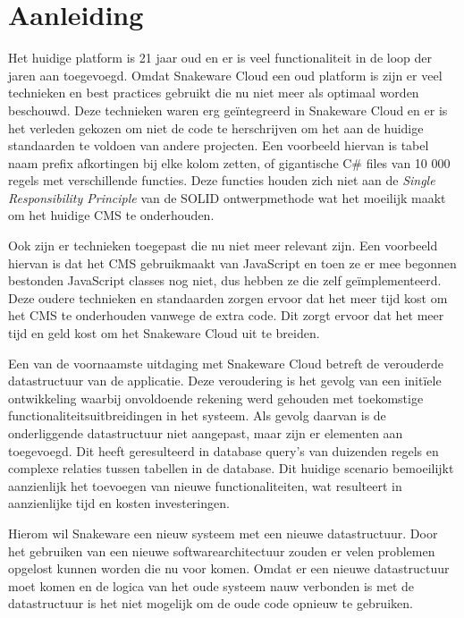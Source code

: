 \section{Aanleiding}
Het huidige platform is 21 jaar oud en er is veel functionaliteit in de loop der jaren aan toegevoegd.
Omdat Snakeware Cloud een oud platform is zijn er veel technieken en best practices gebruikt die nu niet meer als optimaal worden beschouwd.
Deze technieken waren erg geïntegreerd in Snakeware Cloud en er is het verleden gekozen om niet de code te herschrijven om het aan de huidige standaarden te voldoen van andere projecten.
Een voorbeeld hiervan is tabel naam prefix afkortingen bij elke kolom zetten, of gigantische C\# \Parencite{CSharp} files van 10 000 regels met verschillende functies.
Deze functies houden zich niet aan de \textit{Single Responsibility Principle} van de SOLID ontwerpmethode \Parencite{SOLID} wat het moeilijk maakt om het huidige \gls{CMS} te onderhouden.

\whitespace
Ook zijn er technieken toegepast die nu niet meer relevant zijn.
Een voorbeeld hiervan is dat het \gls{CMS} gebruikmaakt van JavaScript \Parencite{JavaScript} en toen ze er mee begonnen bestonden JavaScript classes \Parencite{JavascriptClasses} nog niet, dus hebben ze die zelf geïmplementeerd.
Deze oudere technieken en standaarden zorgen ervoor dat het meer tijd kost om het CMS te onderhouden vanwege de extra code.
Dit zorgt ervoor dat het meer tijd en geld kost om het Snakeware Cloud uit te breiden.

\whitespace[2]
Een van de voornaamste uitdaging met Snakeware Cloud betreft de verouderde datastructuur van de applicatie.
Deze veroudering is het gevolg van een initïele ontwikkeling waarbij onvoldoende rekening werd gehouden met toekomstige functionaliteitsuitbreidingen in het systeem.
Als gevolg daarvan is de onderliggende datastructuur niet aangepast, maar zijn er elementen aan toegevoegd.
Dit heeft geresulteerd in database query's van duizenden regels en complexe relaties tussen tabellen in de database.
Dit huidige scenario bemoeilijkt aanzienlijk het toevoegen van nieuwe functionaliteiten, wat resulteert in aanzienlijke tijd en kosten investeringen.

\whitespace
Hierom wil Snakeware een nieuw systeem met een nieuwe datastructuur.
Door het gebruiken van een nieuwe softwarearchitectuur zouden er velen problemen opgelost kunnen worden die nu voor komen.
Omdat er een nieuwe datastructuur moet komen en de logica van het oude systeem nauw verbonden is met de datastructuur is het niet mogelijk om de oude code opnieuw te gebruiken.
